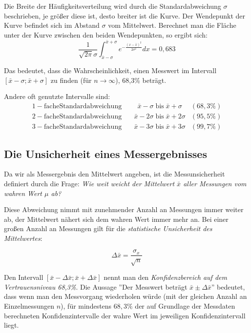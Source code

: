 Die Breite der Häufigkeitsverteilung wird durch die Standardabweichung $\sigma$ beschrieben, je größer diese ist, desto breiter ist die Kurve. Der Wendepunkt der Kurve befindet sich im Abstand $\sigma$ vom Mittelwert. Berechnet man die Fläche unter der Kurve zwischen den beiden Wendepunkten, so ergibt sich:
\begin{equation}
	\frac{1}{\sqrt{2\pi}\sigma}\int_{\bar{x}-\sigma}^{\bar{x}+\sigma}{e^{-\frac{\left(x-\bar{x}\right)^2}{2\sigma^2}}dx} = 0,683
\end{equation}

Das bedeutet, dass die Wahrscheinlichkeit, einen Messwert im Intervall $\left[\bar{x}-\sigma; \bar{x}+\sigma\right]$ zu finden (für $n\rightarrow\infty$), 68,3\% beträgt.

\noindent
Andere oft genutzte Intervalle sind:
\begin{align*}
	\mathrm{1-fache Standardabweichung} &\quad \phantom{0}\bar{x}-\sigma \; \mathrm{bis}\; \bar{x}+\sigma & (68,3\%)\\
	\mathrm{2-fache Standardabweichung} &\quad \bar{x}-2\sigma\; \mathrm{bis}\; \bar{x}+2\sigma & (95,5\%)\\
	\mathrm{3-fache Standardabweichung} &\quad \bar{x}-3\sigma\; \mathrm{bis}\; \bar{x}+3\sigma & (99,7\%)
\end{align*}
\subsection{Die Unsicherheit eines Messergebnisses}

Da wir als Messergebnis den Mittelwert angeben, ist die Messunsicherheit definiert durch die Frage: \textit{Wie weit weicht der Mittelwert $\bar{x}$ aller Messungen vom wahren Wert $\mu$ ab?}

Diese Abweichung nimmt mit zunehmender Anzahl an Messungen immer weiter ab, der Mittelwert nähert sich dem wahren Wert immer mehr an. Bei einer großen Anzahl an Messungen gilt für die \textit{statistische Unsicherheit des Mittelwertes}:
\begin{important}
	\begin{equation}
		\Delta{\bar{x}} = \frac{\sigma_x}{\sqrt{n}}
	\end{equation}
\end{important}

Den Intervall $\left[\bar{x}-\Delta\bar{x}; \bar{x}+\Delta\bar{x}\right]$ nennt man den \textit{Konfidenzbereich auf dem Vertrauensniveau 68,3\%}. Die Aussage ''Der Messwert beträgt $\bar{x}\pm\Delta\bar{x}$'' bedeutet, dass wenn man den Messvorgang wiederholen würde (mit der gleichen Anzahl an Einzelmessungen $n$), für mindestens $68,3\%$ der auf Grundlage der Messdaten berechneten Konfidenzintervalle der wahre Wert im jeweiligen Konfidenzintervall liegt.

